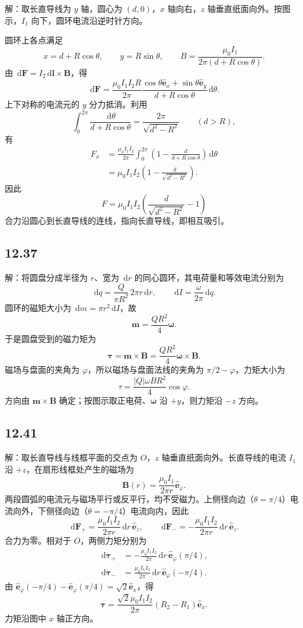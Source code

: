 \documentclass[UTF8,a4paper,12pt]{ctexart}
\newcommand{\dd}{\,\mathrm{d}}
\newcommand{\ez}{\hat{\bm e}_z}
\newcommand{\ep}{\hat{\bm e}_{\varphi}}
\begin{document}
解：取长直导线为 $y$ 轴，圆心为 $(d,0)$，$x$ 轴向右，$z$ 轴垂直纸面向外。按图示，$I_1$ 向下，圆环电流沿逆时针方向。

圆环上各点满足
\[
x=d+R\cos\theta,\qquad y=R\sin\theta,
\qquad B=\frac{\mu_0I_1}{2\pi(d+R\cos\theta)}.
\]
由 $\dd\bm F=I_2\dd\bm l\times\bm B$，得
\[
\dd\bm F=\frac{\mu_0I_1I_2R}{2\pi}
\frac{\cos\theta\hat{\bm e}_x+\sin\theta\hat{\bm e}_y}
{d+R\cos\theta}\dd\theta.
\]
上下对称的电流元的 $y$ 分力抵消。利用
\[
\int_0^{2\pi}\frac{\dd\theta}{d+R\cos\theta}
=\frac{2\pi}{\sqrt{d^2-R^2}}\qquad(d>R),
\]
有
\[
\begin{aligned}
F_x
&=\frac{\mu_0I_1I_2}{2\pi}
\int_0^{2\pi}\left(1-\frac{d}{d+R\cos\theta}\right)\dd\theta\\
&=\mu_0I_1I_2\left(1-\frac{d}{\sqrt{d^2-R^2}}\right).
\end{aligned}
\]
因此
\[
\boxed{F=\mu_0I_1I_2\left(\frac{d}{\sqrt{d^2-R^2}}-1\right)}
\]
合力沿圆心到长直导线的连线，指向长直导线，即相互吸引。

\subsection*{12.37}

解：将圆盘分成半径为 $r$、宽为 $\dd r$ 的同心圆环，其电荷量和等效电流分别为
\[
\dd q=\frac{Q}{\pi R^2}\,2\pi r\dd r,
\qquad
\dd I=\frac{\omega}{2\pi}\dd q.
\]
圆环的磁矩大小为 $\dd m=\pi r^2\dd I$，故
\[
\bm m=\frac{Q R^2}{4}\bm\omega.
\]
于是圆盘受到的磁力矩为
\[
\boxed{\bm\tau=\bm m\times\bm B
=\frac{QR^2}{4}\bm\omega\times\bm B}.
\]
磁场与盘面的夹角为 $\varphi$，所以磁场与盘面法线的夹角为 $\pi/2-\varphi$，力矩大小为
\[
\boxed{\tau=\frac{|Q|\omega BR^2}{4}\cos\varphi}.
\]
方向由 $\bm m\times\bm B$ 确定；按图示取正电荷、$\bm\omega$ 沿 $+y$，则力矩沿 $-z$ 方向。

\subsection*{12.41}

解：取长直导线与线框平面的交点为 $O$，$z$ 轴垂直纸面向外。长直导线的电流 $I_1$ 沿 $+z$，在扇形线框处产生的磁场为
\[
\bm B(r)=\frac{\mu_0 I_1}{2\pi r}\ep.
\]
两段圆弧的电流元与磁场平行或反平行，均不受磁力。上侧径向边（$\theta=\pi/4$）电流向外，下侧径向边（$\theta=-\pi/4$）电流向内，因此
\[
\dd\bm F_+=\frac{\mu_0I_1I_2}{2\pi r}\dd r\,\ez,
\qquad
\dd\bm F_-=-\frac{\mu_0I_1I_2}{2\pi r}\dd r\,\ez.
\]
合力为零。相对于 $O$，两侧力矩分别为
\[
\begin{aligned}
\dd\bm\tau_+&=-\frac{\mu_0I_1I_2}{2\pi}\dd r\,\ep(\pi/4),\\
\dd\bm\tau_-&=\frac{\mu_0I_1I_2}{2\pi}\dd r\,\ep(-\pi/4).
\end{aligned}
\]
由 $\ep(-\pi/4)-\ep(\pi/4)=\sqrt2\hat{\bm e}_x$，得
\[
\boxed{\bm\tau=
\frac{\sqrt2\mu_0I_1I_2}{2\pi}(R_2-R_1)\hat{\bm e}_x}.
\]
力矩沿图中 $x$ 轴正方向。
\end{document}
